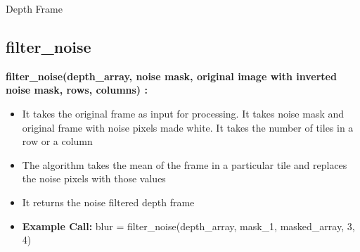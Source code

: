 \documentclass[10pt, a4paper]{beamer}
\begin{document}
\begin{frame}[allowframebreaks]{Depth Frame}
  \subsection{filter\_noise}
    \textbf{filter\_noise(depth\_array, noise mask, original image with inverted noise mask, rows, columns) : }
     \begin{itemize}
      \item It takes the original frame as input for processing. It takes noise mask and original frame with noise pixels made white. It takes the number of tiles in a row or a column
      \item The algorithm takes the mean of the frame in a particular tile and replaces the noise pixels with those values
      \item It returns the noise filtered depth frame
      \item \textbf{Example Call:} blur = filter\_noise(depth\_array, mask\_1, masked\_array, 3, 4)
     \end{itemize}
\end{frame}
\end{document}
